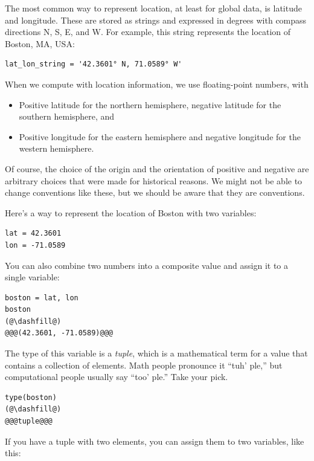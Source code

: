 The most common way to represent location, at
least for global data, is latitude and longitude. These are stored as
strings and expressed in degrees with compass
directions N, S, E, and W. For example, this string represents the
location of Boston, MA, USA:

\begin{lstlisting}[]
lat_lon_string = '42.3601° N, 71.0589° W'
\end{lstlisting}

When we compute with location information, we use floating-point
numbers, with

\begin{itemize}
\item
  Positive latitude for the northern hemisphere, negative latitude for
  the southern hemisphere, and
\item
  Positive longitude for the eastern hemisphere and negative longitude
  for the western hemisphere.
\end{itemize}

Of course, the choice of the origin and the orientation of positive and
negative are arbitrary choices that were made for historical reasons. We
might not be able to change conventions like these, but we should be
aware that they are conventions.

Here's a way to represent the location of Boston with two variables:

\begin{lstlisting}[]
lat = 42.3601
lon = -71.0589
\end{lstlisting}

You can also combine two numbers into a composite value and
assign it to a single variable:

\begin{lstlisting}[]
boston = lat, lon
boston
(@\dashfill@)
@@@(42.3601, -71.0589)@@@
\end{lstlisting}

The type of this variable is a  \emph{tuple}, which is a
mathematical term for a value that contains a collection of elements. Math
people pronounce it ``tuh' ple,'' but computational people usually say
``too' ple.'' Take your pick.

\begin{lstlisting}[]
type(boston)
(@\dashfill@)
@@@tuple@@@
\end{lstlisting}

If you have a tuple with two elements, you can assign them to two
variables, like this:

